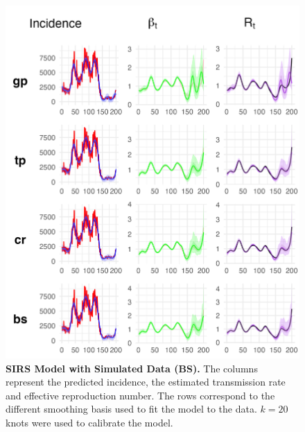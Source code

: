 \documentclass[
11pt, %
oneside, %
english, %
singlespacing, %
]{macthesis} %
\begin{document}
\begin{figure}[H]
\centering
\includegraphics[width=\textwidth]{figure/Simulated/unaggregated/sim_combined_bs.png}
\caption[SIRS model with simulated data (BS).]{\textbf{SIRS Model with Simulated Data (BS).} The columns represent the predicted incidence, the estimated transmission rate and effective reproduction number. The rows correspond to the different smoothing basis used to fit the model to the data. \(k=20\) knots were used to calibrate the model.}
\label{fig:sim_bs}
\end{figure}
\end{document}
